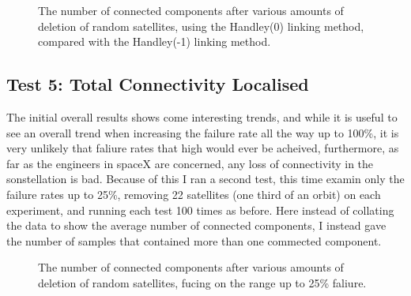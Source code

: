 \documentclass[12pt]{article}
\begin{document}
\begin{figure}
\label{fig:Connected Components After Deletions Variant}
\caption{The number of connected components after various amounts of deletion of random satellites, using the Handley(0) linking method, compared with the Handley(-1) linking method.}
\end{figure}


\subsection{Test 5: Total Connectivity Localised}

The initial overall results shows come interesting trends, and while it is useful to see an overall trend when increasing the failure rate all the way up to 100\%, it is very unlikely that faliure rates that high would ever be acheived, furthermore, as far as the engineers in spaceX are concerned, any loss of connectivity in the sonstellation is bad. Because of this I ran a second test, this time examin only the failure rates up to 25\%, removing 22 satellites (one third of an orbit) on each experiment, and running each test 100 times as before. Here instead of collating the data to show the average number of connected components, I instead gave the number of samples that contained more than one commected component. %

\begin{figure}
\label{fig:Connected Components To 25}
\caption{The number of connected components after various amounts of deletion of random satellites, fucing on the range up to 25\% faliure.}
\end{figure}
\end{document}
